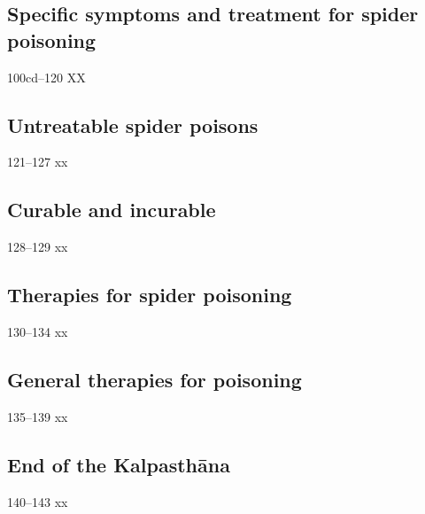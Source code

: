 \begin{translation}
 \subsection{Specific symptoms and treatment for spider poisoning}
 
 \item[100cd--120] XX
 
 \subsection{Untreatable spider poisons}
 
 \item [121--127] xx
 
 \subsection{Curable and incurable}
 
 \item[128--129] xx
 
 \subsection{Therapies for spider poisoning}
 
 \item [130--134] xx
 
\subsection{General therapies for poisoning}

\item [135--139] xx

\subsection{End of the Kalpasthāna}

\item[140--143] xx
 
\end{translation}